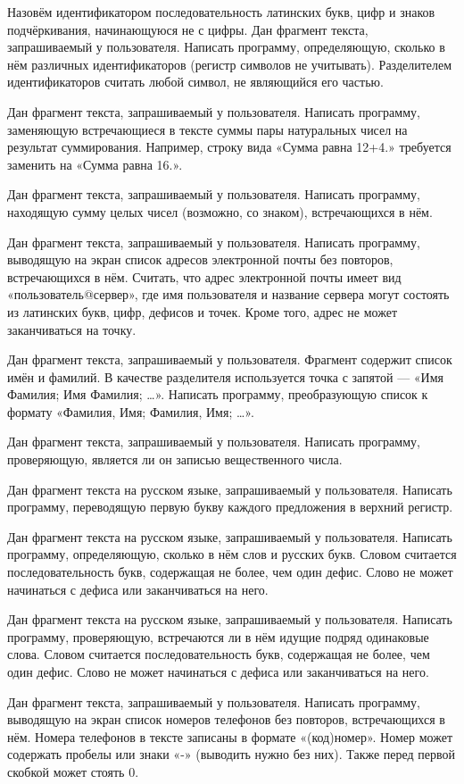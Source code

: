 \task Назовём идентификатором последовательность латинских букв, цифр
и знаков подчёркивания, начинающуюся не с цифры. Дан фрагмент текста,
запрашиваемый у пользователя. Написать программу, определяющую,
сколько в нём различных идентификаторов (регистр символов не
учитывать). Разделителем идентификаторов считать любой символ, не
являющийся его частью.

\task Дан фрагмент текста, запрашиваемый у пользователя. Написать
программу, заменяющую встречающиеся в тексте суммы пары натуральных чисел
на результат суммирования. Например, строку вида «Сумма равна 12+4.»
требуется заменить на «Сумма равна 16.».

\task Дан фрагмент текста, запрашиваемый у пользователя. Написать
программу, находящую сумму целых чисел (возможно, со знаком),
встречающихся в нём.

\task Дан фрагмент текста, запрашиваемый у пользователя. Написать
программу, выводящую на экран список адресов электронной почты без
повторов, встречающихся в нём. Считать, что адрес электронной почты
имеет вид «пользователь@сервер», где имя пользователя и название
сервера могут состоять из латинских букв, цифр, дефисов и точек.
Кроме того, адрес не может заканчиваться на точку.

\task Дан фрагмент текста, запрашиваемый у пользователя. Фрагмент
содержит список имён и фамилий. В качестве разделителя используется
точка с запятой — «Имя Фамилия; Имя Фамилия; …». Написать программу,
преобразующую список к формату «Фамилия, Имя; Фамилия, Имя; …».

\task Дан фрагмент текста, запрашиваемый у пользователя. Написать
программу, проверяющую, является ли он записью вещественного числа.

\task Дан фрагмент текста на русском языке, запрашиваемый у
пользователя. Написать программу, переводящую первую букву каждого
предложения в верхний регистр.

\task Дан фрагмент текста на русском языке, запрашиваемый у пользователя.
Написать программу, определяющую, сколько в нём слов и русских букв.
Словом считается последовательность букв, содержащая не более, чем один
дефис. Слово не может начинаться с дефиса или заканчиваться на него.

\task Дан фрагмент текста на русском языке, запрашиваемый у пользователя.
Написать программу, проверяющую, встречаются ли в нём идущие подряд
одинаковые слова. Словом считается последовательность букв, содержащая
не более, чем один дефис. Слово не может начинаться с дефиса или
заканчиваться на него.

\task Дан фрагмент текста, запрашиваемый у пользователя. Написать
программу, выводящую на экран список номеров телефонов без повторов,
встречающихся в нём. Номера телефонов в тексте записаны в формате
«(код)номер». Номер может содержать пробелы или знаки «-» (выводить нужно
без них). Также перед первой скобкой может стоять 0.
